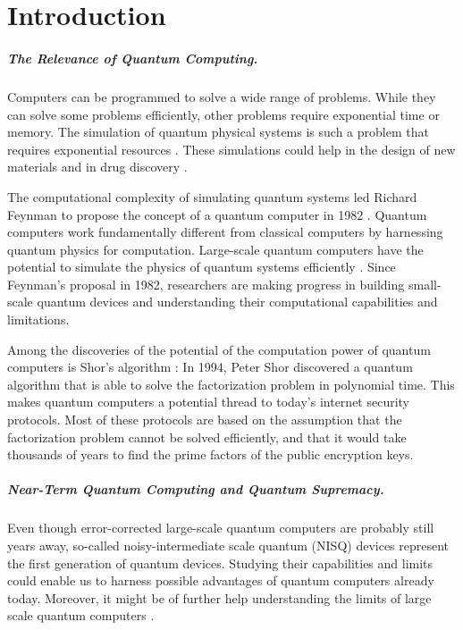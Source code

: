 \chapter{Introduction}

\paragraph{The Relevance of Quantum Computing.}
Computers can be programmed to solve a wide range of problems.
While they can solve some problems efficiently, 
other problems require exponential time or memory. The simulation 
of quantum physical systems is such a problem that requires 
exponential resources \cite{nielsen2002quantum}.  
These simulations could help in the design 
of new materials and in drug discovery \cite{8585034}.

The computational complexity of simulating quantum systems led 
Richard Feynman to propose the concept of a quantum computer in 1982 \cite{feynman1982simulating}. 
Quantum computers work fundamentally different from classical computers by 
harnessing quantum physics for computation. Large-scale quantum computers have the potential
to simulate the physics of quantum systems efficiently \cite{Zalka_1998}.
Since Feynman's proposal in 1982, researchers are making progress in building small-scale 
quantum devices and understanding their computational capabilities and limitations.

Among the discoveries of the potential of the computation power of quantum computers is Shor's algorithm \cite{shor1997factorisation}: 
In 1994, Peter Shor discovered a quantum algorithm that is able to solve the 
factorization problem in polynomial time. This makes quantum computers a potential thread to 
today's internet security protocols. Most of these protocols are based on the assumption 
that the factorization problem cannot be solved efficiently, and that it would take thousands of years to find the 
prime factors of the public encryption keys.

\paragraph{Near-Term Quantum Computing and Quantum Supremacy.}
Even though error-corrected large-scale quantum computers are probably still 
years away, so-called noisy-intermediate scale 
quantum (NISQ) devices represent the first generation of quantum devices.
Studying their capabilities and limits could enable us to harness possible advantages 
of quantum computers already today. Moreover, it might be of further help understanding
the limits of large scale quantum computers \cite{Preskill_2018}.


